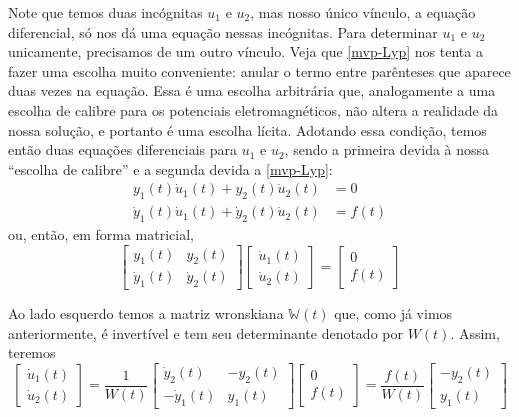 \documentclass[12pt,a4paper,oneside]{memoir}
\newcommand{\WronskianMatrix}{\mathbb{W}}
\begin{document}
Note que temos duas incógnitas $u_1$ e $u_2$, mas nosso único vínculo, a equação diferencial, só nos dá uma equação nessas incógnitas.  Para determinar $u_1$ e $u_2$ unicamente, precisamos de um outro vínculo.  Veja que \eqref{mvp-Lyp} nos tenta a fazer uma escolha muito conveniente: anular o termo entre parênteses que aparece duas vezes na equação.  Essa é uma escolha arbitrária que, analogamente a uma escolha de calibre para os potenciais eletromagnéticos, não altera a realidade da nossa solução, e portanto é uma escolha lícita.  Adotando essa condição, temos então duas equações diferenciais para $u_1$ e $u_2$, sendo a primeira devida à nossa ``escolha de calibre'' e a segunda devida a \eqref{mvp-Lyp}:
%
\begin{align}
\label{mvp-c1}
  y_1(t) \dot{u}_1(t) + y_2(t) \dot{u}_2(t) &= 0 \\
\label{mvp-c2}
  \dot{y}_1(t) \dot{u}_1(t) + \dot{y}_2(t) \dot{u}_2(t) &= f(t)
\end{align}
ou, então, em forma matricial,
\begin{equation}
  \begin{bmatrix}
          y_1(t)  &       y_2(t)  \\
    \dot{y}_1(t)  & \dot{y}_2(t)
  \end{bmatrix}
  \begin{bmatrix}
    \dot{u}_1(t) \\
    \dot{u}_2(t)
  \end{bmatrix}
  =
  \begin{bmatrix}
    0 \\
    f(t)
  \end{bmatrix}
\end{equation}

Ao lado esquerdo temos a matriz wronskiana $\WronskianMatrix(t)$ que, como já vimos anteriormente, é invertível e tem seu determinante denotado por $W(t)$.  Assim, teremos
\begin{equation}
  \begin{bmatrix}
    \dot{u}_1(t) \\
    \dot{u}_2(t)
  \end{bmatrix}
  =
  \frac{1}{W(t)}
  \begin{bmatrix}
    \dot{y}_2(t)  &      -y_2(t)  \\
   -\dot{y}_1(t)  &       y_1(t)
  \end{bmatrix}
  \begin{bmatrix}
    0 \\
    f(t)
  \end{bmatrix}
  =
  \frac{f(t)}{W(t)}
  \begin{bmatrix}
   -y_2(t)  \\
    y_1(t)
  \end{bmatrix}
\end{equation}
\end{document}
